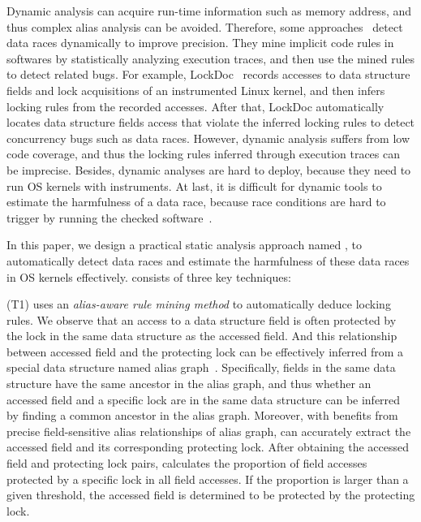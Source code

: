 Dynamic analysis can acquire run-time information such as memory address, and 
thus complex alias analysis can be avoided. Therefore, some 
approaches~\cite{Lochmann:EuroSys19, Lu:SOSP07, Lu:FSE18, Joshi:ASE08, 
Liu:NSDI07} detect data races dynamically to improve precision. They mine 
implicit code rules in softwares by statistically analyzing execution traces, 
and then use the mined rules to detect related bugs. For example, 
LockDoc~\cite{Lochmann:EuroSys19} records accesses to data structure fields and 
lock acquisitions of an instrumented Linux kernel, and then infers locking 
rules from the recorded accesses. After that, LockDoc automatically locates 
data structure fields access that violate the inferred locking rules to detect 
concurrency bugs such as data races. However, dynamic analysis suffers from low 
code coverage, and thus the locking rules inferred through execution traces can 
be imprecise. Besides, dynamic analyses are hard to deploy, because they need 
to run OS kernels with instruments. At last, it is difficult for dynamic 
tools to estimate the harmfulness of a data race, because race conditions are 
hard to trigger by running the checked software~\cite{Fonseca:DSN10, 
Burckhardt:ASPLOS10, Liu:FSE14, Zhou:EASE15}.

In this paper, we design a practical static analysis approach named \sys, 
to automatically detect data races and estimate the harmfulness of these data 
races in OS kernels effectively. \sys consists of three key techniques:

(T1) \sys uses an {\em alias-aware rule mining method} to automatically 
deduce locking rules. We observe that an access to a data structure field is 
often protected by the lock in the same data structure as the accessed field. 
And this relationship between accessed field and the protecting lock can be 
effectively inferred from a special data structure named alias 
graph~\cite{Li:ASPLOS22, Kastrinis:CC18}. Specifically, fields in the same data 
structure have the same ancestor in the alias graph, and thus whether an 
accessed field and a specific lock are in the same data structure can be 
inferred by finding a common ancestor in the alias graph. Moreover, with 
benefits from precise field-sensitive alias relationships of alias graph, 
\sys can accurately extract the accessed field and its corresponding 
protecting lock. After obtaining the accessed field and protecting lock pairs, 
\sys calculates the proportion of field accesses protected by a specific 
lock in all field accesses. If the proportion is larger than a given threshold, 
the accessed field is determined to be protected by the protecting lock.

